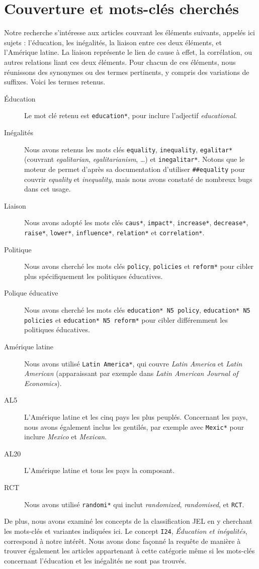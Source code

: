 \documentclass[pagesize, twoside=off, bibliography=totoc, DIV=calc, fontsize=12pt, a4paper, french]{scrartcl}
\begin{document}
\section{Couverture et mots-clés cherchés}
Notre recherche s’intéresse aux articles couvrant les éléments suivants, appelés ici \og{}sujets\fg{} : l’éducation, les inégalités, la liaison entre ces deux éléments, et l’Amérique latine. La liaison représente le lien de cause à effet, la corrélation, ou autres relations liant ces deux éléments. Pour chacun de ces éléments, nous réunissons des synonymes ou des termes pertinents, y compris des variations de suffixes. Voici les termes retenus.

\begin{description}
  \item[Éducation] Le mot clé retenu est \texttt{education*}, pour inclure l’adjectif \emph{educational}.
  \item[Inégalités] Nous avons retenus les mots clés \texttt{equality}, \texttt{inequality}, \texttt{egalitar*} (couvrant \emph{egalitarian}, \emph{egalitarianism}, …) et \texttt{inegalitar*}. Notons que le moteur de \citet{ebscohost_searching_2024} permet d’après sa documentation d’utiliser \texttt{\#\#equality} pour couvrir \emph{equality} et \emph{inequality}, mais nous avons constaté de nombreux bugs dans cet usage.
  \item[Liaison] Nous avons adopté les mots clés \texttt{caus*}, \texttt{impact*}, \texttt{increase*}, \texttt{decrease*}, \texttt{raise*}, \texttt{lower*}, \texttt{influence*}, \texttt{relation*} et \texttt{correlation*}.
  \item[Politique] Nous avons cherché les mots clés \texttt{policy}, \texttt{policies} et \texttt{reform*} pour cibler plus spécifiquement les politiques éducatives.
  \item[Polique éducative] Nous avons cherché les mots clés \texttt{education* N5 policy}, \texttt{education* N5 policies} et \texttt{education* N5 reform*} pour cibler différemment les politiques éducatives. 
  \item[Amérique latine] Nous avons utilisé \texttt{Latin America*}, qui couvre \emph{Latin America} et \emph{Latin American} (apparaissant par exemple dans \emph{Latin American Journal of Economics}). 
  \item[AL5] L’Amérique latine et les cinq pays les plus peuplés. Concernant les pays, nous avons également inclus les gentilés, par exemple avec \texttt{Mexic*} pour inclure \emph{Mexico} et \emph{Mexican}.
  \item[AL20] L’Amérique latine et tous les pays la composant.
  \item[RCT] Nous avons utilisé \texttt{randomi*} qui inclut \emph{randomized}, \emph{randomised}, et \texttt{RCT}.
\end{description}
De plus, nous avons examiné les concepts de la classification JEL en y cherchant les mots-clés et variantes indiquées ici. Le concept \texttt{I24}, \emph{Éducation et inégalités}, correspond à notre intérêt.
Nous avons donc façonné la requête de manière à trouver également les articles appartenant à cette catégorie même si les mots-clés concernant l’éducation et les inégalités ne sont pas trouvés.
\end{document}
